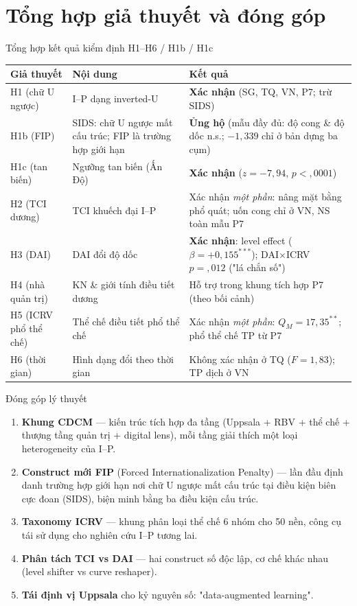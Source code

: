 \documentclass[aspectratio=169,11pt]{beamer}
\newcommand{\kw}[1]{\textcolor{accent}{\textbf{#1}}}
\begin{document}
\section{Tổng hợp giả thuyết và đóng góp}
\begin{frame}{Tổng hợp kết quả kiểm định H1--H6 / H1b / H1c}
  \scriptsize
  \begin{tabular}{@{}p{1.6cm}p{4.3cm}p{6.0cm}@{}}
    \toprule
    \textbf{Giả thuyết} & \textbf{Nội dung} & \textbf{Kết quả} \\
    \midrule
    H1 (chữ U ngược) & I--P dạng inverted-U & \kw{Xác nhận} (SG, TQ, VN, P7; trừ SIDS) \\
    H1b (FIP) & SIDS: chữ U ngược mất cấu trúc; FIP là trường hợp giới hạn & \kw{Ủng hộ} (mẫu đầy đủ: độ cong \& độ dốc n.s.; $-1{,}339$ chỉ ở bản dựng ba cụm) \\
    H1c (tan biến) & Ngưỡng tan biến (Ấn Độ) & \kw{Xác nhận} ($z=-7{,}94$, $p<{,}0001$) \\
    H2 (TCI dương) & TCI khuếch đại I--P & Xác nhận \emph{một phần}: nâng mặt bằng phổ quát; uốn cong chỉ ở VN, NS toàn mẫu P7 \\
    H3 (DAI) & DAI đổi độ dốc & \kw{Xác nhận}: level effect ($\beta=+0{,}155^{***}$); DAI$\times$ICRV $p={,}012$ ("lá chắn số") \\
    H4 (nhà quản trị) & KN \& giới tính điều tiết dương & Hỗ trợ trong khung tích hợp P7 (theo bối cảnh) \\
    H5 (ICRV phổ thể chế) & Thể chế điều tiết phổ thể chế & Xác nhận \emph{một phần}: $Q_M=17{,}35^{**}$; phổ thể chế TP từ P7 \\
    H6 (thời gian) & Hình dạng đổi theo thời gian & Không xác nhận ở TQ ($F=1{,}83$); TP dịch ở VN \\
    \bottomrule
  \end{tabular}
\end{frame}

\begin{frame}{Đóng góp lý thuyết}
  \begin{enumerate}
    \item \kw{Khung CDCM} --- kiến trúc tích hợp đa tầng (Uppsala + RBV + thể chế + thượng tầng quản trị + digital lens), mỗi tầng giải thích một loại heterogeneity của I--P.
    \item \kw{Construct mới FIP} (Forced Internationalization Penalty) --- lần đầu định danh trường hợp giới hạn nơi chữ U ngược mất cấu trúc tại điều kiện biên cực đoan (SIDS), biện minh bằng ba điều kiện cấu trúc.
    \item \kw{Taxonomy ICRV} --- khung phân loại thể chế 6 nhóm cho 50 nền, công cụ tái sử dụng cho nghiên cứu I--P tương lai.
    \item \kw{Phân tách TCI vs DAI} --- hai construct số độc lập, cơ chế khác nhau (level shifter vs curve reshaper).
    \item \kw{Tái định vị Uppsala} cho kỷ nguyên số: "data-augmented learning".
  \end{enumerate}
\end{frame}
\end{document}
